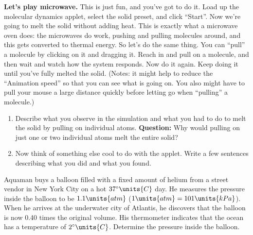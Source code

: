 \begin{problem} {\bf Let's play microwave.}  This is just fun, and
  you've got to do it.  Load up the molecular dynamics applet, select
  the solid preset, and click ``Start''.  Now we're going to melt the
  solid without adding heat.  This is exactly what a microwave oven
  does: the microwaves do work, pushing and pulling molecules around,
  and this gets converted to thermal energy.  So let's do the same
  thing.  You can ``pull'' a molecule by clicking on it and dragging
  it.  Reach in and pull on a molecule, and then wait and watch how the
  system responds.  Now do it again.  Keep doing it until you've fully
  melted the solid.  (Notes: it might help to reduce the ``Animation
  speed'' so that you can see what is going on.  You also might have
  to pull your mouse a large distance quickly before letting go when
  ``pulling'' a molecule.)

\begin{enumerate}
\item Describe what you observe in the simulation and what you had to
  do to melt the solid by pulling on individual atoms.  {\bf
    Question:} Why would pulling on just one or two individual atoms
  melt the entire solid?

\item Now think of something else cool to do with the applet.  Write a
  few sentences describing what you did and what you found.
\end{enumerate}
\end{problem}

\begin{problem}
  Aquaman buys a balloon filled with a fixed amount of helium from a
  street vendor in New York City on a hot $37^{\circ}\units{C}$ day.
  He measures the pressure inside the balloon to be $1.1\units{atm}$
  ($1\units{atm}=101\units{kPa}$).  When he arrives at the underwater
  city of Atlantis, he discovers that the balloon is now 0.40 times
  the original volume.  His thermometer indicates that the ocean has a
  temperature of $2^{\circ}\units{C}$.  Determine the pressure inside
  the balloon.
\label{problem:aquaman}
\end{problem}

